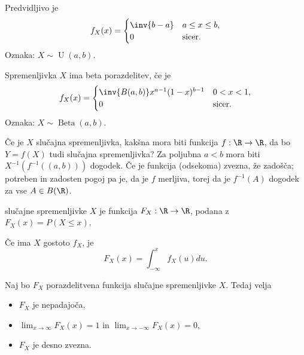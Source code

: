 \begin{primer}
  Predvidljivo je
  \[
	f_X(x) =
	\begin{cases}
	  \inv{b-a} & a \le x \le b, \\
	  0 & \text{sicer.}
	\end{cases}
  \]
  Oznaka: $X \sim \operatorname{U}(a,b)$.
\end{primer}

\begin{primer}
  Spremenljivka $X$ ima beta porazdelitev, če je
  \[
	f_X(x) =
	\begin{cases}
	  \inv{B(a, b)} x^{a-1} (1-x)^{b-1} & 0 < x < 1, \\
	  0 & \text{sicer.}
	\end{cases}
  \]
  Oznaka: $X \sim \operatorname{Beta}(a, b)$.
\end{primer}


Če je $X$ slučajna spremenljivka, kakšna mora biti funkcija $f: \R \to \R$, da
bo $Y = f(X)$ tudi slučajna spremenljivka?
Za poljubna $a < b$ mora biti $X^{-1}(f^{-1}((a, b)))$ dogodek.
Če je funkcija (odsekoma) zvezna, že zadošča; potreben in zadosten pogoj pa je,
da je $f$ merljiva, torej da je $f^{-1}(A)$ dogodek za vse $A \in B(\R)$.

\begin{definicija}
   slučajne spremenljivke $X$ je funkcija $F_X :
  \R \to \R$, podana z $F_X(x) = P(X \le x)$.
\end{definicija}
Če ima $X$ gostoto $f_X$, je
\[
  F_X(x) = \int_{-\infty}^x f_X(u) du.
\]

\begin{izrek}
  Naj bo $F_X$ porazdelitvena funkcija slučajne spremenljivke $X$.
  Tedaj velja
  \begin{itemize}
  \item $F_X$ je nepadajoča,
  \item $\lim_{x \to \infty} F_X(x) = 1$ in $\lim_{x \to -\infty} F_X(x) = 0$,
  \item $F_X$ je desno zvezna.
  \end{itemize}
\end{izrek}

